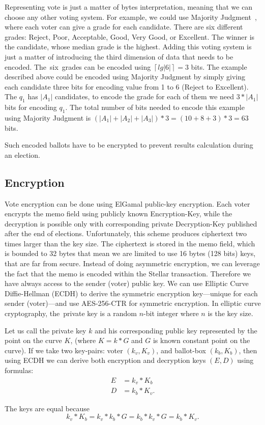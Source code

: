 \documentclass[applsci,article,accept,moreauthors,pdftex]{Definitions/mdpi}
\newcommand{\ceil}[1]{\left\lceil #1 \right\rceil}
\begin{document}
Representing vote is just a matter of bytes interpretation, meaning that we can choose any other voting system. For example, we could use Majority Judgment~\cite{balinski2011majority}, where each voter can give a grade for each candidate. There are six different grades: Reject, Poor, Acceptable, Good, Very Good, or Excellent. The winner is the candidate, whose median grade is the highest. Adding this voting system is just a matter of introducing the third dimension of data that needs to be encoded. The~six~grades can be encoded using $\ceil{lg{|6|}} = 3$ bits. The example described above could be encoded using Majority Judgment by simply giving each candidate three bits for encoding value from 1 to 6 (Reject to Excellent). The $q_1$ has $|A_1|$ candidates, to encode the grade for each of them we need $3 * |A_1|$ bits for encoding $q_1$. The total number of bits needed to encode this example using Majority Judgment is $(|A_1| + |A_2| + |A_3|) * 3 = (10 + 8 + 3) * 3 = 63$ bits. 

Such encoded ballots have to be encrypted to prevent results calculation during an election.

\subsection{Encryption}
\label{encryption}
Vote encryption can be done using ElGamal public-key encryption. Each voter encrypts the memo field using publicly known Encryption-Key, while the decryption is possible only with corresponding private Decryption-Key published after the end of elections. Unfortunately, this scheme produces ciphertext two times larger than the key size. The ciphertext is stored in the memo field, which is bounded to 32 bytes that mean we are limited to use 16 bytes (128 bits) keys, that are far from secure. Instead of doing asymmetric encryption, we can leverage the fact that the memo is encoded within the Stellar transaction. Therefore we have always access to the sender (voter) public key. We can use Elliptic Curve Diffie-Hellman (ECDH) to derive the symmetric encryption key––unique for each sender (voter)––and use AES-256-CTR for symmetric encryption. In elliptic curve cryptography, the~private key is a random $n$-bit integer where $n$ is the key size. 

\begin{samepage} 
Let us call the private key $k$ and his corresponding public key represented by the point on the curve $K$, (where $K = k * G$ and $G$ is known constant point on the curve). If we take two key-pairs: voter $(k_v,K_v)$, and ballot-box $(k_b,K_b)$, then using ECDH we can derive both encryption and decryption keys $(E,D)$ using formulas:
\begin{align}
E &= k_v * K_b \\
D &= k_b * K_v.    
\end{align}

The keys are equal because 
\begin{equation}
k_v * K_b = k_v * k_b * G = k_b * k_v * G = k_b * K_v.
\end{equation}
\end{samepage} 
\end{document}

